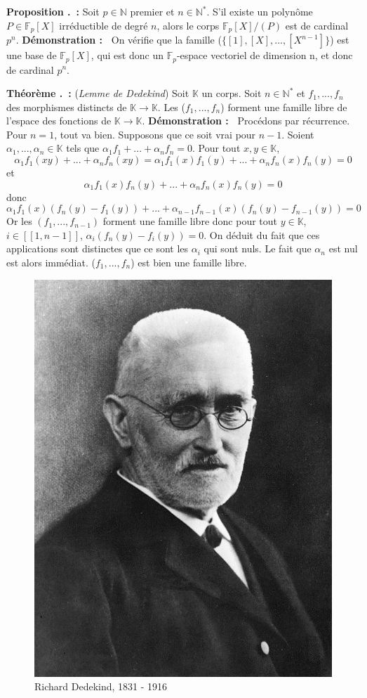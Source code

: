 \documentclass[5pt,a4paper]{article}
\newcounter{prop}[section]
\newcounter{thm}[section]
\renewcommand{\theprop}{\thesection.\arabic{prop}}
\renewcommand{\thethm}{\thesection.\arabic{thm}}
\newcommand{\prop}[1]{\stepcounter{prop}\noindent\textbf{Proposition \theprop ~:} #1 \newline}
\newcommand{\thm}[1]{\stepcounter{thm}\noindent\textbf{Théorème \thethm ~:} #1 \newline}
\newcommand{\demo}[1]{\textbf{Démonstration :~} #1 \newline}
\begin{document}
\begin{onehalfspacing}
\prop{Soit $p \in \mathbb{N}$ premier et $n \in \mathbb{N}^{*}$. S'il existe un polynôme $P \in \mathbb{F}_{p}[X]$ irréductible de degré $n$, alors le corps $\mathbb{F}_p[X]/(P)$ est de cardinal $p^n$.}
\demo{On vérifie que la famille ($\{[1], [X], ..., [X^{n - 1}]\}$) est une base de $\mathbb{F}_{p}[X]$, qui est donc un $\mathbb{F}_p$-espace vectoriel de dimension n, et donc de cardinal $p^n$.}


\thm{(\textit{Lemme de Dedekind}) Soit $\mathbb{K}$ un corps. Soit $n \in \mathbb{N}^*$ et $f_1, ..., f_n$ des morphismes distincts de $\mathbb{K} \rightarrow \mathbb{K}$. Les ($f_1, ..., f_n$) forment une famille libre de l'espace des fonctions de $\mathbb{K} \rightarrow \mathbb{K}$.}
\demo{Procédons par récurrence. Pour $n=1$, tout va bien. Supposons que ce soit vrai pour $n-1$. Soient $\alpha_1, ..., \alpha_n \in \mathbb{K}$ tels que $\alpha_1f_1 + ... + \alpha_nf_n = 0$. Pour tout $x, y \in \mathbb{K}$, 
\[\alpha_1f_1(xy) + ... + \alpha_nf_n(xy) = \alpha_1f_1(x)f_1(y) + ... + \alpha_nf_n(x)f_n(y) = 0\] 
et
\[\alpha_1f_1(x)f_n(y) + ... + \alpha_nf_n(x)f_n(y) = 0\]
donc 
\[\alpha_1f_1(x)(f_n(y) - f_1(y)) + ... + \alpha_{n-1}f_{n-1}(x)(f_n(y) - f_{n-1}(y)) = 0\]
Or les $(f_1, ..., f_{n-1})$ forment une famille libre donc pour tout $y \in \mathbb{K}$, $i \in [\![ 1, n-1]\!]$, $\alpha_i(f_n(y) - f_i(y)) = 0$. On déduit du fait que ces applications sont distinctes que ce sont les $\alpha_i$ qui sont nuls. Le fait que $\alpha_n$ est nul est alors immédiat. ($f_1, ..., f_n$) est bien une famille libre.}

\begin{figure}[H]
\centering
\includegraphics[width = 0.28\linewidth]{ressources/dedekind.jpg}
\caption{Richard Dedekind, 1831 - 1916}
\end{figure}



\end{onehalfspacing}
\end{document}
